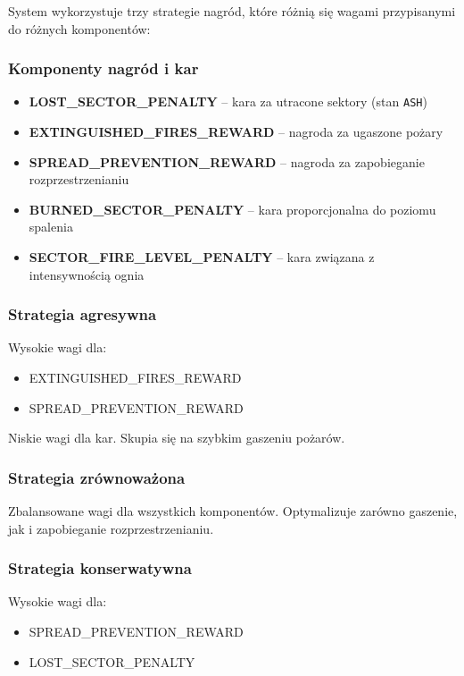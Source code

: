 System wykorzystuje trzy strategie nagród, które różnią się wagami przypisanymi do różnych komponentów:

\subsubsection{Komponenty nagród i kar}

\begin{itemize}
    \item \textbf{LOST\_SECTOR\_PENALTY} -- kara za utracone sektory (stan \texttt{ASH})
    \item \textbf{EXTINGUISHED\_FIRES\_REWARD} -- nagroda za ugaszone pożary
    \item \textbf{SPREAD\_PREVENTION\_REWARD} -- nagroda za zapobieganie rozprzestrzenianiu
    \item \textbf{BURNED\_SECTOR\_PENALTY} -- kara proporcjonalna do poziomu spalenia
    \item \textbf{SECTOR\_FIRE\_LEVEL\_PENALTY} -- kara związana z intensywnością ognia
\end{itemize}

\subsubsection{Strategia agresywna}

Wysokie wagi dla:
\begin{itemize}
    \item EXTINGUISHED\_FIRES\_REWARD
    \item SPREAD\_PREVENTION\_REWARD
\end{itemize}

Niskie wagi dla kar. Skupia się na szybkim gaszeniu pożarów.

\subsubsection{Strategia zrównoważona}

Zbalansowane wagi dla wszystkich komponentów. Optymalizuje zarówno gaszenie, jak i zapobieganie rozprzestrzenianiu.

\subsubsection{Strategia konserwatywna}

Wysokie wagi dla:
\begin{itemize}
    \item SPREAD\_PREVENTION\_REWARD
    \item LOST\_SECTOR\_PENALTY
\end{itemize}

